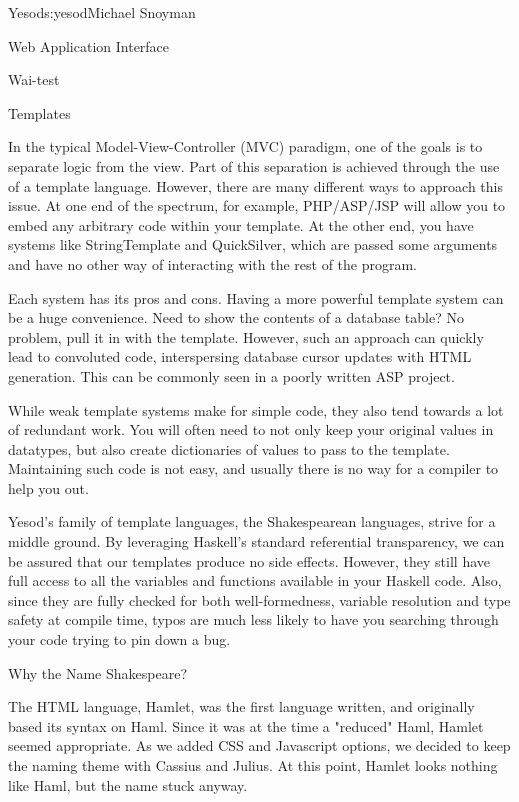 \begin{aosachapter}{Yesod}{s:yesod}{Michael Snoyman}
\begin{aosasect1}{Web Application Interface}
\begin{aosasect2}{Wai-test}
\end{aosasect2}

\end{aosasect1}

\begin{aosasect1}{Templates}

In the typical Model-View-Controller (MVC) paradigm, one of the goals
is to separate logic from the view. Part of this separation is
achieved through the use of a template language. However, there are
many different ways to approach this issue. At one end of the
spectrum, for example, PHP/ASP/JSP will allow you to embed any
arbitrary code within your template. At the other end, you have
systems like StringTemplate and QuickSilver, which are passed some
arguments and have no other way of interacting with the rest of the
program.

Each system has its pros and cons. Having a more powerful template
system can be a huge convenience. Need to show the contents of a
database table? No problem, pull it in with the template. However,
such an approach can quickly lead to convoluted code, interspersing
database cursor updates with HTML generation. This can be commonly
seen in a poorly written ASP project.

While weak template systems make for simple code, they also tend
towards a lot of redundant work. You will often need to not only keep
your original values in datatypes, but also create dictionaries of
values to pass to the template. Maintaining such code is not easy, and
usually there is no way for a compiler to help you out.

Yesod's family of template languages, the Shakespearean languages,
strive for a middle ground. By leveraging Haskell's standard
referential transparency, we can be assured that our templates produce
no side effects. However, they still have full access to all the
variables and functions available in your Haskell code. Also, since
they are fully checked for both well-formedness, variable resolution
and type safety at compile time, typos are much less likely to have
you searching through your code trying to pin down a bug.

\begin{aosabox}{Why the Name Shakespeare?}

The HTML language, Hamlet, was the first language written, and
originally based its syntax on Haml. Since it was at the time a
"reduced" Haml, Hamlet seemed appropriate. As we added CSS and
Javascript options, we decided to keep the naming theme with Cassius
and Julius. At this point, Hamlet looks nothing like Haml, but the
name stuck anyway.


\end{aosabox}
\end{aosasect1}
\end{aosachapter}
